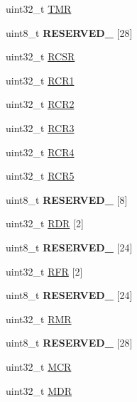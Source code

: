 \begin{DoxyCompactItemize}
\item 
uint32\+\_\+t \hyperlink{struct_i2_s___mem_map_a52b2dd69044a5f8c990749c314664ae1}{T\+M\+R}
\item 
\hypertarget{struct_i2_s___mem_map_ad2e533cc0581714912a23fe357f30710}{}uint8\+\_\+t {\bfseries R\+E\+S\+E\+R\+V\+E\+D\+\_} \mbox{[}28\mbox{]}\label{struct_i2_s___mem_map_ad2e533cc0581714912a23fe357f30710}

\item 
uint32\+\_\+t \hyperlink{struct_i2_s___mem_map_adf26fb4a1039d9061d9a23093e1624f5}{R\+C\+S\+R}
\item 
uint32\+\_\+t \hyperlink{struct_i2_s___mem_map_a260d1f4873f89a5072fce0812f479824}{R\+C\+R1}
\item 
uint32\+\_\+t \hyperlink{struct_i2_s___mem_map_a29720183f5d0741e5beeb4f68b1f3480}{R\+C\+R2}
\item 
uint32\+\_\+t \hyperlink{struct_i2_s___mem_map_ae96e284d7e6ec36cb87d0431588c489d}{R\+C\+R3}
\item 
uint32\+\_\+t \hyperlink{struct_i2_s___mem_map_af6f0d11fd84c4cb0be68adb569f3f578}{R\+C\+R4}
\item 
uint32\+\_\+t \hyperlink{struct_i2_s___mem_map_ada5677c98d1cf918e91389e40256159a}{R\+C\+R5}
\item 
\hypertarget{struct_i2_s___mem_map_a1a3d806cdbca3c5c69fec7b04bb36b82}{}uint8\+\_\+t {\bfseries R\+E\+S\+E\+R\+V\+E\+D\+\_} \mbox{[}8\mbox{]}\label{struct_i2_s___mem_map_a1a3d806cdbca3c5c69fec7b04bb36b82}

\item 
uint32\+\_\+t \hyperlink{struct_i2_s___mem_map_a4bc0643c4d11f8c3db6275fdcc118d05}{R\+D\+R} \mbox{[}2\mbox{]}
\item 
\hypertarget{struct_i2_s___mem_map_a0b2b4f811c29a593eadf99fb5795f51a}{}uint8\+\_\+t {\bfseries R\+E\+S\+E\+R\+V\+E\+D\+\_} \mbox{[}24\mbox{]}\label{struct_i2_s___mem_map_a0b2b4f811c29a593eadf99fb5795f51a}

\item 
uint32\+\_\+t \hyperlink{struct_i2_s___mem_map_ac7142d72a5d91e4b1b086c037d514559}{R\+F\+R} \mbox{[}2\mbox{]}
\item 
\hypertarget{struct_i2_s___mem_map_a074ecb0baa7a00e75cf9af330df13fae}{}uint8\+\_\+t {\bfseries R\+E\+S\+E\+R\+V\+E\+D\+\_} \mbox{[}24\mbox{]}\label{struct_i2_s___mem_map_a074ecb0baa7a00e75cf9af330df13fae}

\item 
uint32\+\_\+t \hyperlink{struct_i2_s___mem_map_af8727047a9c7ea717dcfb8f94061b6a3}{R\+M\+R}
\item 
\hypertarget{struct_i2_s___mem_map_ae16cdca273359b0d3c23f95876f246b0}{}uint8\+\_\+t {\bfseries R\+E\+S\+E\+R\+V\+E\+D\+\_} \mbox{[}28\mbox{]}\label{struct_i2_s___mem_map_ae16cdca273359b0d3c23f95876f246b0}

\item 
uint32\+\_\+t \hyperlink{struct_i2_s___mem_map_ae0d902ef484de4b08fb15ac3bb335cc4}{M\+C\+R}
\item 
uint32\+\_\+t \hyperlink{struct_i2_s___mem_map_a2c12ce85b2f95cc5f4f4cb594e1df7e0}{M\+D\+R}
\end{DoxyCompactItemize}


